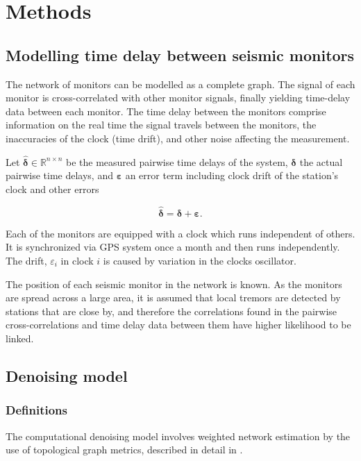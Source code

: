 \documentclass[12pt,a4paper,english]{article}
\begin{document}
\section{Methods}

\subsection{Modelling time delay between seismic monitors}
The network of monitors can be modelled as a complete graph. The signal of each monitor is cross-correlated with other monitor signals, finally yielding time-delay data between each monitor. The time delay between the monitors comprise information on the real time the signal travels between the monitors, the inaccuracies of the clock (time drift), and other noise affecting the measurement. 

Let $\bm{\hat{\delta}} \in \mathbb{R}^{n\times n}$ be the measured pairwise time delays of the system, $\bm{\delta}$ the actual pairwise time delays, and $\bm{\varepsilon}$ an error term including clock drift of the station's clock and other errors

\begin{equation}
\bm{\hat{\delta}}  = \bm{\delta} + \bm{\varepsilon}.
\label{eq:model}
\end{equation}
 
Each of the monitors are equipped with a clock which runs independent of others. It is synchronized via GPS system once a month and then runs independently. The drift, $\varepsilon_i$ in clock $i$ is caused by variation in the clocks oscillator.  

The position of each seismic monitor in the network is known. As the monitors are spread across a large area, it is assumed that local tremors are detected by stations that are close by, and therefore the correlations found in the pairwise cross-correlations and time delay data between them have higher likelihood to be linked. 

\subsection{Denoising model}
\subsubsection{Definitions}
The computational denoising model involves weighted network estimation by the use of topological graph metrics, described in detail in \cite{Spyrou2017}. 
\end{document}
